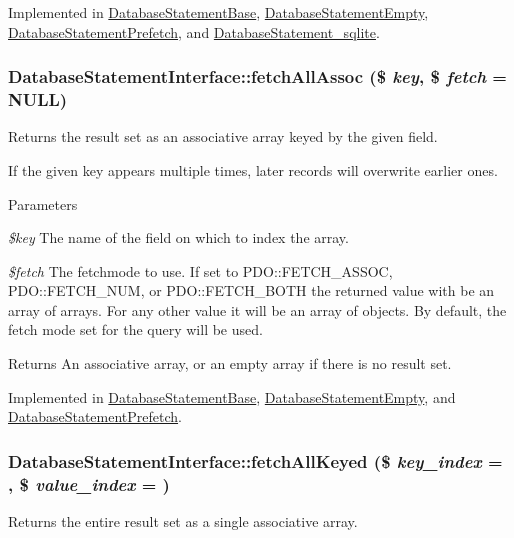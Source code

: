 Implemented in \hyperlink{classDatabaseStatementBase_a21521f5da2bf06d851bfb782c0d21b52}{DatabaseStatementBase}, \hyperlink{classDatabaseStatementEmpty_a01d549f8173db0919ba199cb4e8d92a9}{DatabaseStatementEmpty}, \hyperlink{classDatabaseStatementPrefetch_a302e9f0e9aa09e2a8ccd7bd17679f8cd}{DatabaseStatementPrefetch}, and \hyperlink{classDatabaseStatement__sqlite_a2b23f3a9e83efae1690475b7c6cda0a8}{DatabaseStatement\_\-sqlite}.\hypertarget{interfaceDatabaseStatementInterface_a8be68ba0a27dc2f5358c5bcf3243108b}{
\subsubsection[{fetchAllAssoc}]{\setlength{\rightskip}{0pt plus 5cm}DatabaseStatementInterface::fetchAllAssoc (\$ {\em key}, \/  \$ {\em fetch} = {\ttfamily NULL})}}
\label{interfaceDatabaseStatementInterface_a8be68ba0a27dc2f5358c5bcf3243108b}
Returns the result set as an associative array keyed by the given field.

If the given key appears multiple times, later records will overwrite earlier ones.


\begin{DoxyParams}{Parameters}
\item[{\em \$key}]The name of the field on which to index the array. \item[{\em \$fetch}]The fetchmode to use. If set to PDO::FETCH\_\-ASSOC, PDO::FETCH\_\-NUM, or PDO::FETCH\_\-BOTH the returned value with be an array of arrays. For any other value it will be an array of objects. By default, the fetch mode set for the query will be used.\end{DoxyParams}
\begin{DoxyReturn}{Returns}
An associative array, or an empty array if there is no result set. 
\end{DoxyReturn}


Implemented in \hyperlink{classDatabaseStatementBase_a7ed7713a07605775cf41019d52b65f35}{DatabaseStatementBase}, \hyperlink{classDatabaseStatementEmpty_a7715d753726ebd0b6c292faabfc4ed90}{DatabaseStatementEmpty}, and \hyperlink{classDatabaseStatementPrefetch_a74915ad2c601fa0bf4a9a43ad6180a94}{DatabaseStatementPrefetch}.\hypertarget{interfaceDatabaseStatementInterface_a9ffce739d0b144c36fc60b0a7e8a9824}{
\subsubsection[{fetchAllKeyed}]{\setlength{\rightskip}{0pt plus 5cm}DatabaseStatementInterface::fetchAllKeyed (\$ {\em key\_\-index} = {}, \/  \$ {\em value\_\-index} = {})}}
\label{interfaceDatabaseStatementInterface_a9ffce739d0b144c36fc60b0a7e8a9824}
Returns the entire result set as a single associative array.

